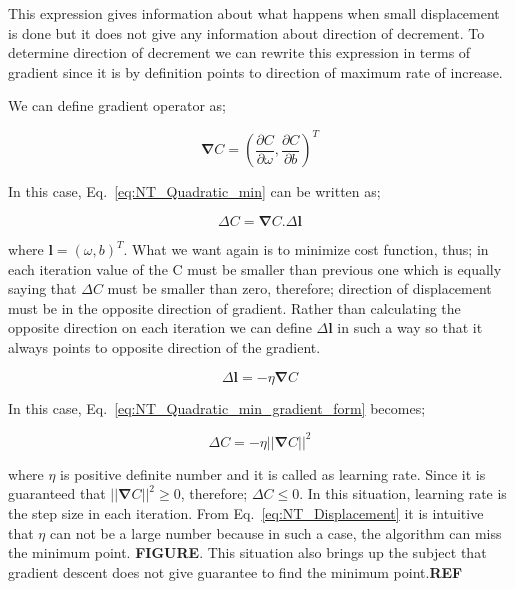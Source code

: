 \documentclass[a4paper,times,12pt]{article}
\begin{document}
This expression gives information about what happens when small displacement is done but it does not give any information about direction of decrement. To determine direction of decrement we can rewrite this expression in terms of gradient since it is by definition points to direction of maximum rate of increase. 

We can define gradient operator as;

\begin{equation}
\label{eq:gradient}
\boldsymbol{\nabla}{C} = \left(\frac{\partial{C}}{\partial{\omega}},\frac{\partial{C}}{\partial{b}} \right)^T
\end{equation}

In this case, Eq.~\ref{eq:NT_Quadratic_min} can be written as;

\begin{equation}
\label{eq:NT_Quadratic_min_gradient_form}
\Delta{C} = \boldsymbol{\nabla}{C} \boldsymbol{.} \Delta \boldsymbol{l}
\end{equation}

where $\boldsymbol{l} = (\omega, b)^T$. What we want again is to minimize cost function, thus; in each iteration value of the C must be smaller than previous one which is equally saying that $\Delta{C}$ must be smaller than zero, therefore; direction of displacement must be in the opposite direction of gradient. Rather than calculating the opposite direction on each iteration we can define $\Delta{\boldsymbol{l}}$ in such a way so that it always points to opposite direction of the gradient.

\begin{equation}
\label{eq:NT_learning_rate}
\Delta{\boldsymbol{l}} = -\eta\boldsymbol{\nabla}C
\end{equation}

In this case, Eq.~\ref{eq:NT_Quadratic_min_gradient_form} becomes;

\begin{equation}
\label{eq:NT_Displacement}
\Delta{C} = -\eta ||\boldsymbol{\nabla}{C}||^2
\end{equation}

where $\eta$ is positive definite number and it is called as learning rate. Since it is guaranteed that $||\boldsymbol{\nabla}{C}||^2 \geq 0$, therefore; $\Delta{C} \leq 0$. In this situation, learning rate is the step size in each iteration. From Eq.~\ref{eq:NT_Displacement} it is intuitive that $\eta$ can not be a large number because in such a case, the algorithm can miss the minimum point. \textbf{FIGURE}. This situation also brings up the subject that gradient descent does not give guarantee to find the minimum point.{\textbf{REF}} 
\end{document}
